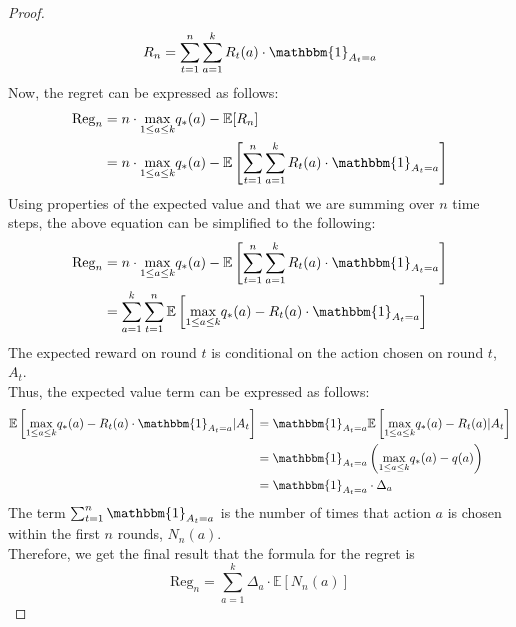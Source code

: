 \documentclass{article}
\begin{document}
\begin{enumerate}[a)]
\begin{itemize}
\begin{proof}
\begin{equation*}
                R_{n} = \sum_{t=1}^{n}\sum_{a = 1}^{k} R_{t}(a) \cdot \mathbbm{1}_{A_{t} = a}
            \end{equation*}
            Now, the regret can be expressed as follows:
            \begin{equation*}
                \begin{aligned}
                    \text{Reg}_{n} &= n \cdot \underset{1\leq a \leq k}{\max} q_{*}(a) - \mathbb{E}[R_{n}]\\
                    &= n \cdot \underset{1\leq a \leq k}{\max} q_{*}(a) - \mathbb{E}\left[\sum_{t=1}^{n}\sum_{a = 1}^{k} R_{t}(a) \cdot \mathbbm{1}_{A_{t} = a}\right]
                \end{aligned}
            \end{equation*}
            Using properties of the expected value and that we are summing over $n$ time steps, the above equation can be simplified to the following:
            \begin{equation*}
                \begin{aligned}
                    \text{Reg}_{n} &= n \cdot \underset{1\leq a \leq k}{\max} q_{*}(a) - \mathbb{E}\left[\sum_{t=1}^{n}\sum_{a = 1}^{k} R_{t}(a) \cdot \mathbbm{1}_{A_{t} = a}\right]\\
                    &= \sum_{a=1}^{k}\sum_{t=1}^{n} \mathbb{E}\left[\underset{1\leq a \leq k}{\max} q_{*}(a)-R_{t}(a) \cdot \mathbbm{1}_{A_{t}=a}\right]
                \end{aligned}
            \end{equation*}
            The expected reward on round $t$ is conditional on the action chosen on round $t$, $A_{t}$.\\
            Thus, the expected value term can be expressed as follows:
            \begin{equation*}
                \begin{aligned}
                    \mathbb{E}\left[\underset{1\leq a \leq k}{\max} q_{*}(a)-R_{t}(a) \cdot \mathbbm{1}_{A_{t}=a} | A_{t}\right] &= \mathbbm{1}_{A_{t}=a} \mathbb{E}\left[\underset{1\leq a \leq k}{\max} q_{*}(a)-R_{t}(a) | A_{t}\right]\\
                    &= \mathbbm{1}_{A_{t}=a} \left(\underset{1\leq a \leq k}{\max} q_{*}(a)-q(a)\right)\\
                    &= \mathbbm{1}_{A_{t}=a} \cdot \Delta_{a}\\
                \end{aligned}
            \end{equation*}
            The term $\sum_{t=1}^{n} \mathbbm{1}_{A_{t}=a}$ is the number of times that action $a$ is chosen within the first $n$ rounds, $N_{n}(a)$.\\
            Therefore, we get the final result that the formula for the regret is
            \begin{equation*}
                \text{Reg}_{n} = \sum_{a=1}^{k} \Delta_{a} \cdot \mathbb{E}[N_{n}(a)]
            \end{equation*}
        \end{proof}
    \end{itemize}


\end{enumerate}
\end{document}
